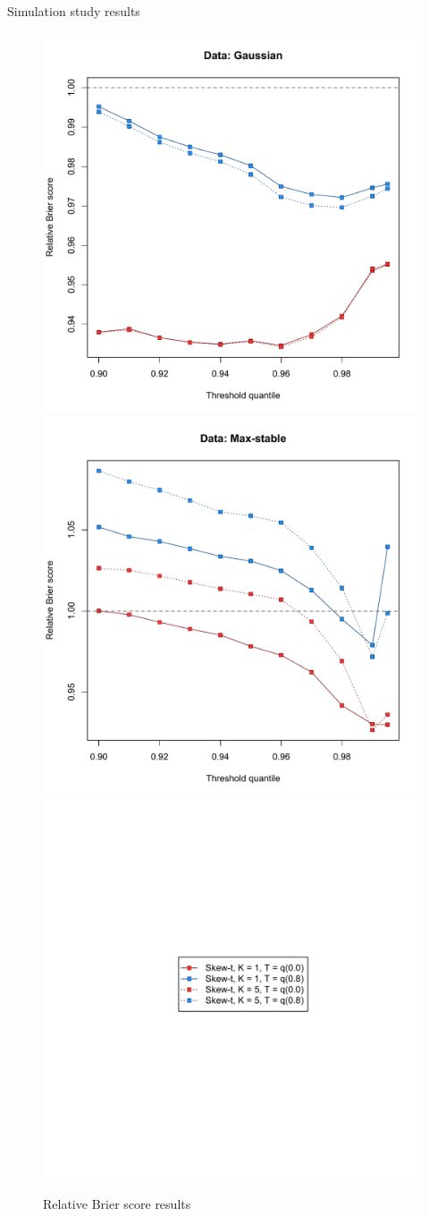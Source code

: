 \documentclass{beamer}
\begin{document}
\begin{frame}{Simulation study results}
\centering
  \begin{figure}
    \includegraphics[width=0.45\linewidth]{./plots/pot/bs-sim-gaus.pdf}
    \includegraphics[width=0.45\linewidth]{./plots/pot/bs-sim-max.pdf} \\
    \includegraphics[width=0.3\linewidth, trim=2in 3.25in 2in 3in]{./plots/pot/bs-sim-legend.pdf}
    \caption{Relative Brier score results}
  \end{figure}
\end{frame}

\end{document}
